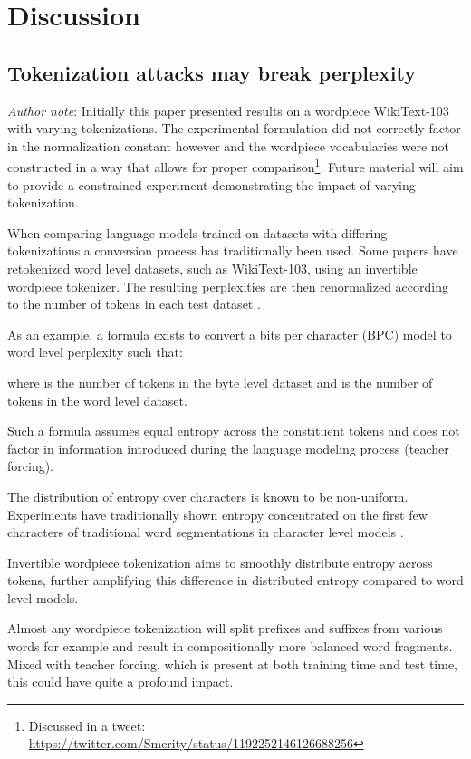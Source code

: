 \documentclass{article}
\begin{document}
\section{Discussion}

\subsection{Tokenization attacks may break perplexity} 

\textit{Author note}: Initially this paper presented results on a wordpiece WikiText-103 with varying tokenizations.
The experimental formulation did not correctly factor in the normalization constant however and the wordpiece vocabularies were not constructed in a way that allows for proper comparison\footnote{Discussed in a tweet: \url{https://twitter.com/Smerity/status/1192252146126688256}}.
Future material will aim to provide a constrained experiment demonstrating the impact of varying tokenization.


When comparing language models trained on datasets with differing tokenizations a conversion process has traditionally been used.
Some papers have retokenized word level datasets, such as WikiText-103, using an invertible wordpiece tokenizer.
The resulting perplexities are then renormalized according to the number of tokens in each test dataset \cite{mikolov2012subword, hwang2017character}.

As an example, a formula exists to convert a bits per character (BPC) model to word level perplexity such that:

where  is the number of tokens in the byte level dataset and  is the number of tokens in the word level dataset.

Such a formula assumes equal entropy across the constituent tokens and does not factor in information introduced during the language modeling process (teacher forcing).

The distribution of entropy over characters is known to be non-uniform.
Experiments have traditionally shown entropy concentrated on the first few characters of traditional word segmentations in character level models \cite{elman1990finding}.

Invertible wordpiece tokenization aims to smoothly distribute entropy across tokens, further amplifying this difference in distributed entropy compared to word level models.






Almost any wordpiece tokenization will split prefixes and suffixes from various words for example and result in compositionally more balanced word fragments.
Mixed with teacher forcing, which is present at both training time and test time, this could have quite a profound impact.
\end{document}
